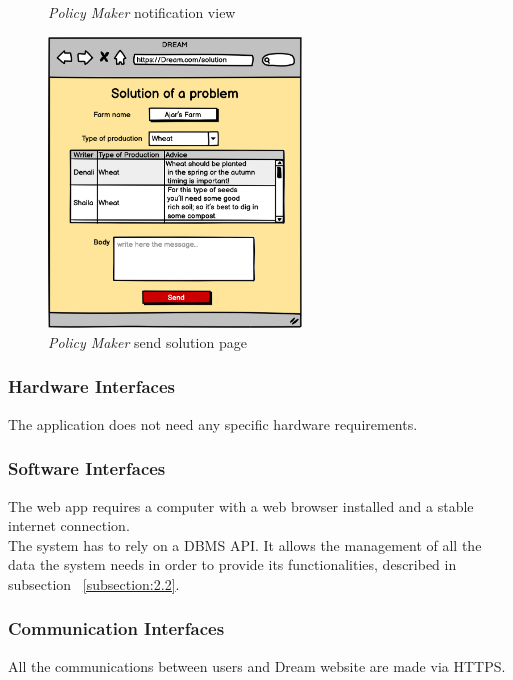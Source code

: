 \begin{figure}[ht!]
\begin{minipage}{0.47\textwidth}
        \caption{\emph{Policy Maker} notification view}
        \label{fig:PMnotification}
    \end{minipage}
\end{figure}


\begin{figure}[H]
    \begin{center}
    \includegraphics[width=0.6\textwidth]{mockups/Solution.png}
    \caption{\emph{Policy Maker} send solution page}
    \label{fig:PMsolution}
    \end{center}
\end{figure}

\subsubsection{Hardware Interfaces}
The application does not need any specific hardware requirements. 

\subsubsection{Software Interfaces}
The web app requires a computer with a web browser installed and a stable internet connection.\\
The system has to rely on a DBMS API. It allows the management of all the data the system 
needs in order to provide its functionalities, described in subsection ~\ref{subsection:2.2}.

\subsubsection{Communication Interfaces}
All the communications between users and Dream website are made via HTTPS.

